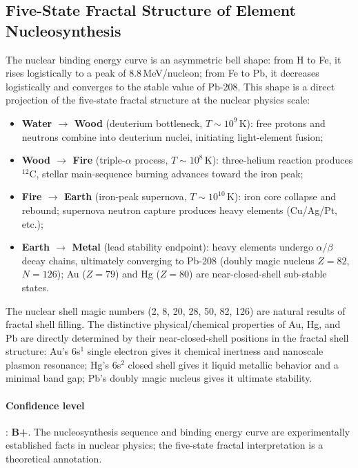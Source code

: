 \documentclass[12pt,a4paper,twocolumn]{article}
\begin{document}
\subsection{Five-State Fractal Structure of Element Nucleosynthesis}
\label{subsec:nucleosynthesis}

The nuclear binding energy curve is an asymmetric bell shape: from H to Fe, it rises logistically to a peak of 8.8\,MeV/nucleon; from Fe to Pb, it decreases logistically and converges to the stable value of Pb-208. This shape is a direct projection of the five-state fractal structure at the nuclear physics scale:

\begin{itemize}
\item \textbf{Water $\to$ Wood} (deuterium bottleneck, $T\sim10^9$\,K): free protons and neutrons combine into deuterium nuclei, initiating light-element fusion;
\item \textbf{Wood $\to$ Fire} (triple-$\alpha$ process, $T\sim10^8$\,K): three-helium reaction produces $^{12}$C, stellar main-sequence burning advances toward the iron peak;
\item \textbf{Fire $\to$ Earth} (iron-peak supernova, $T\sim10^{10}$\,K): iron core collapse and rebound; supernova neutron capture produces heavy elements (Cu/Ag/Pt, etc.);
\item \textbf{Earth $\to$ Metal} (lead stability endpoint): heavy elements undergo $\alpha$/$\beta$ decay chains, ultimately converging to Pb-208 (doubly magic nucleus $Z=82$, $N=126$); Au ($Z=79$) and Hg ($Z=80$) are near-closed-shell sub-stable states.
\end{itemize}

The nuclear shell magic numbers (2, 8, 20, 28, 50, 82, 126) are natural results of fractal shell filling. The distinctive physical/chemical properties of Au, Hg, and Pb are directly determined by their near-closed-shell positions in the fractal shell structure: Au's 6s$^1$ single electron gives it chemical inertness and nanoscale plasmon resonance; Hg's 6s$^2$ closed shell gives it liquid metallic behavior and a minimal band gap; Pb's doubly magic nucleus gives it ultimate stability.

\paragraph{Confidence level}: \textbf{B+}. The nucleosynthesis sequence and binding energy curve are experimentally established facts in nuclear physics; the five-state fractal interpretation is a theoretical annotation.
\end{document}
